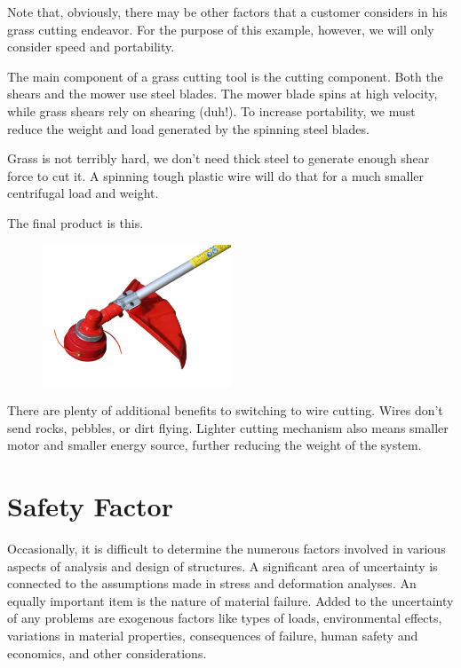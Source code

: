 \documentclass[
10pt,
a4paper,
openany,
svgnames,
]{book}
\begin{document}
\begin{example}
  Note that, obviously, there may be other factors that a customer considers in his grass cutting endeavor. For the purpose of this example, however, we will only consider speed and portability.

  The main component of a grass cutting tool is the cutting component. Both the shears and the mower use steel blades. The mower blade spins at high velocity, while grass shears rely on shearing (duh!). To increase portability, we must reduce the weight and load generated by the spinning steel blades.

  Grass is not terribly hard, we don't need thick steel to generate enough shear force to cut it. A spinning tough plastic wire will do that for a much smaller centrifugal load and weight.

  The final product is this.

  \begin{figure}[H]
    \centering
    \includegraphics[width=0.5\textwidth]{pictures/intro-eng-design/cutter-wire}
  \end{figure}

  There are plenty of additional benefits to switching to wire cutting. Wires don't send rocks, pebbles, or dirt flying. Lighter cutting mechanism also means smaller motor and smaller energy source, further reducing the weight of the system.
\end{example}

\section{Safety Factor}

Occasionally, it is difficult to determine the numerous factors involved in various aspects of analysis and design of structures. A significant area of uncertainty is connected to the assumptions made in stress and deformation analyses. An equally important item is the nature of material failure. Added to the uncertainty of any problems are exogenous factors like types of loads, environmental effects, variations in material properties, consequences of failure, human safety and economics, and other considerations.
\end{document}
